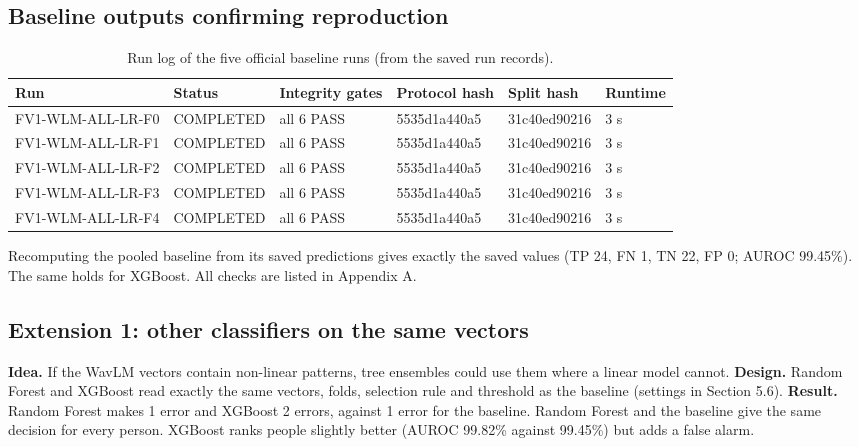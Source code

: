 \documentclass[11pt,a4paper]{article}
\begin{document}
\subsection{Baseline outputs confirming reproduction}\label{sec:reproduction}
\begin{table}[H]\centering\footnotesize\renewcommand{\arraystretch}{1.15}
\caption{Run log of the five official baseline runs (from the saved run records).}
\begin{adjustbox}{max width=\linewidth}\begin{tabular}{llllll}
\toprule
\textbf{Run} & \textbf{Status} & \textbf{Integrity gates} & \textbf{Protocol hash} & \textbf{Split hash} & \textbf{Runtime}\\
\midrule
FV1-WLM-ALL-LR-F0 & COMPLETED & all 6 PASS & 5535d1a440a5 & 31c40ed90216 & 3 s\\
FV1-WLM-ALL-LR-F1 & COMPLETED & all 6 PASS & 5535d1a440a5 & 31c40ed90216 & 3 s\\
FV1-WLM-ALL-LR-F2 & COMPLETED & all 6 PASS & 5535d1a440a5 & 31c40ed90216 & 3 s\\
FV1-WLM-ALL-LR-F3 & COMPLETED & all 6 PASS & 5535d1a440a5 & 31c40ed90216 & 3 s\\
FV1-WLM-ALL-LR-F4 & COMPLETED & all 6 PASS & 5535d1a440a5 & 31c40ed90216 & 3 s\\
\bottomrule
\end{tabular}\end{adjustbox}\end{table}
Recomputing the pooled baseline from its saved predictions gives exactly the saved values (TP 24, FN 1, TN 22, FP 0; AUROC 99.45\%). The same holds for XGBoost. All checks are listed in Appendix A.

\subsection{Extension 1: other classifiers on the same vectors}\label{sec:ext1}
\textbf{Idea.} If the WavLM vectors contain non-linear patterns, tree ensembles could use them where a linear model cannot. \textbf{Design.} Random Forest and XGBoost read exactly the same vectors, folds, selection rule and threshold as the baseline (settings in Section 5.6). \textbf{Result.} Random Forest makes 1 error and XGBoost 2 errors, against 1 error for the baseline. Random Forest and the baseline give the same decision for every person. XGBoost ranks people slightly better (AUROC 99.82\% against 99.45\%) but adds a false alarm.
\end{document}
